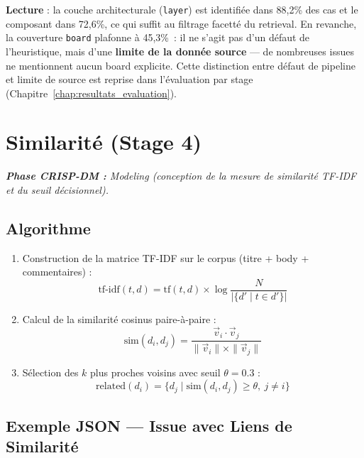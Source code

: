\documentclass[12pt,a4paper]{report}
\begin{document}
\textbf{Lecture} : la couche architecturale (\texttt{layer}) est identifiée dans 88,2\% des cas et le composant dans 72,6\%, ce qui suffit au filtrage facetté du retrieval. En revanche, la couverture \texttt{board} plafonne à 45,3\%~: il ne s'agit pas d'un défaut de l'heuristique, mais d'une \textbf{limite de la donnée source} --- de nombreuses issues ne mentionnent aucun board explicite. Cette distinction entre défaut de pipeline et limite de source est reprise dans l'évaluation par stage (Chapitre~\ref{chap:resultats_evaluation}).

\section{Similarité (Stage 4)}

\textit{\small\textbf{\textcolor{stblue}{Phase CRISP-DM :}} Modeling (conception de la mesure de similarité TF-IDF et du seuil décisionnel).}\par\smallskip

\subsection{Algorithme}
\begin{enumerate}
  \item Construction de la matrice TF-IDF sur le corpus (titre + body + commentaires) :
  \begin{equation}
    \text{tf-idf}(t, d) = \text{tf}(t,d) \times \log\frac{N}{|\{d' \mid t \in d'\}|}
  \end{equation}
  \item Calcul de la similarité cosinus paire-à-paire :
  \begin{equation}
    \text{sim}(d_i, d_j) = \frac{\vec{v}_i \cdot \vec{v}_j}{\|\vec{v}_i\| \times \|\vec{v}_j\|}
  \end{equation}
  \item Sélection des $k$ plus proches voisins avec seuil $\theta = 0.3$ :
  \begin{equation}
    \text{related}(d_i) = \{d_j \mid \text{sim}(d_i, d_j) \geq \theta,\ j \neq i\}
  \end{equation}
\end{enumerate}

\subsection{Exemple JSON --- Issue avec Liens de Similarité}
\end{document}
